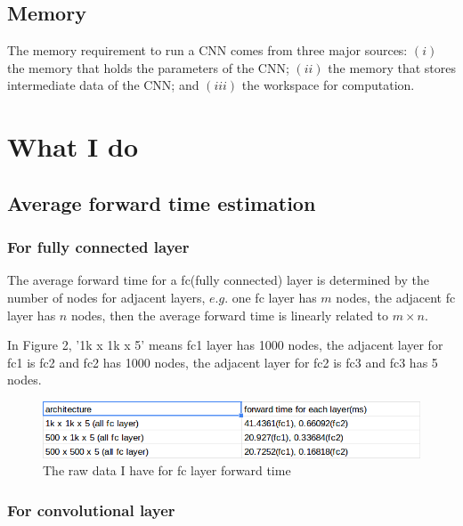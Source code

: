 \documentclass[10pt,twocolumn,letterpaper]{article}
\begin{document}
\subsection{Memory}
The memory requirement to run a CNN comes from three major
sources: $(i)$ the memory that holds the parameters of the CNN; $(ii)$
the memory that stores intermediate data of the CNN; and $(iii)$ the
workspace for computation.
\section{What I do }
\subsection{Average forward time estimation}
\subsubsection{For fully connected layer}
The average forward time for a fc(fully connected) layer is determined by the number of nodes for adjacent layers, $e.g.$ one fc layer has $m$ nodes, the adjacent fc layer has $n$ nodes, then the average forward time is linearly related to $m\times n$. \par
In Figure 2, '1k x 1k x 5' means fc1 layer has 1000 nodes, the adjacent layer for fc1 is fc2 and fc2 has 1000 nodes, the adjacent layer for fc2 is fc3 and fc3 has 5 nodes.
\begin{figure}[h]
	\begin{center}
		
		\includegraphics[width=1\linewidth]{mine1.png}
	\end{center}
	\caption{The raw data I have for fc layer forward time}
	\label{fig:long2}
	\label{fig:onecol2}
\end{figure}

\subsubsection{For convolutional layer}
\end{document}
